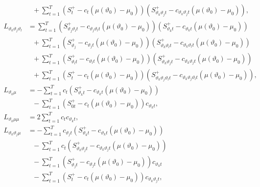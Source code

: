 {{\begin{lemma}
\begin{align*}
    &\ \ \ + \sum_{t = 1}^T  \left(S_{t}^+ - c_{t}\left(\mu(\vartheta_0)-\mu_0\right)\right) \left( S_{ \vartheta_k  \vartheta_j t}^+ -  c_{\vartheta_k  \vartheta_j t}\left(\mu(\vartheta_0)-\mu_0\right)\right), \\
      L_{\vartheta_k \vartheta_j \vartheta_l} &= \sum_{t = 1}^T \left( S_{\vartheta_j \vartheta_l t}^+ -  c_{\vartheta_j \vartheta_l t}\left(\mu(\vartheta_0)-\mu_0\right)\right) \left( S_{\vartheta_k t}^+ -  c_{\vartheta_k t}\left(\mu(\vartheta_0)-\mu_0\right)\right) \\
    &\ \ \ + \sum_{t = 1}^T  \left(S_{\vartheta_j }^+ - c_{\vartheta_j t}\left(\mu(\vartheta_0)-\mu_0\right)\right) \left( S_{ \vartheta_k \vartheta_l t}^+ -  c_{\vartheta_k \vartheta_l t}\left(\mu(\vartheta_0)-\mu_0\right)\right) \\ 
     &\ \ \ + \sum_{t = 1}^T  \left(S_{\vartheta_l t}^+ - c_{\vartheta_l t}\left(\mu(\vartheta_0)-\mu_0\right)\right) \left( S_{ \vartheta_k \vartheta_j t}^+ -  c_{\vartheta_k \vartheta_j t}\left(\mu(\vartheta_0)-\mu_0\right)\right) \\
      &\ \ \ + \sum_{t = 1}^T  \left(S_{t}^+ - c_{ t}\left(\mu(\vartheta_0)-\mu_0\right)\right) \left( S_{ \vartheta_k \vartheta_j \vartheta_l t}^+ -  c_{\vartheta_k \vartheta_j \vartheta_l t}\left(\mu(\vartheta_0)-\mu_0\right)\right), \\
    L_{\vartheta_k \mu}&= - \sum_{t = 1}^T  c_{ t} \left( S_{\vartheta_k t}^+ -  c_{\vartheta_k t}\left(\mu(\vartheta_0)-\mu_0\right)\right) \\
    &\ \ \ -  \sum_{t = 1}^T  \left( S_{0 t}^+ -  c_{ t} \left(\mu(\vartheta_0)-\mu_0\right)\right) c_{\vartheta_k t},  \\
    L_{\vartheta_k \mu \mu }&=  2 \sum_{t = 1}^T  c_{ t}  c_{\vartheta_k t}, \\
    L_{\vartheta_k \vartheta_j \mu} &= -\sum_{t = 1}^T  c_{\vartheta_j t} \left( S_{\vartheta_k t}^+ -  c_{\vartheta_k t}\left(\mu(\vartheta_0)-\mu_0\right)\right) \\
    &\ \ \ - \sum_{t = 1}^T  c_{t} \left( S_{ \vartheta_k \vartheta_j t}^+ -  c_{\vartheta_k \vartheta_j t}\left(\mu(\vartheta_0)-\mu_0\right)\right) \\ 
     &\ \ \ - \sum_{t = 1}^T  \left(S_{\vartheta_j t}^+ - c_{\vartheta_j t}\left(\mu(\vartheta_0)-\mu_0\right)\right) c_{\vartheta_k  t} \\
      &\ \ \ - \sum_{t = 1}^T  \left(S_{ t}^+ - c_{t}\left(\mu(\vartheta_0)-\mu_0\right)\right)  c_{\vartheta_k \vartheta_j t}, \\

\end{align*}
\end{lemma}}}
